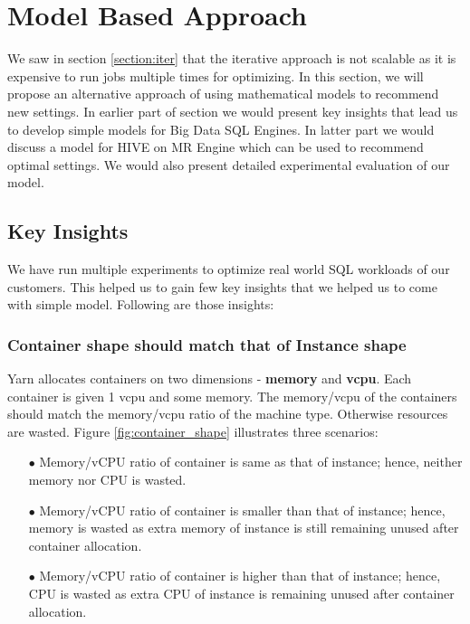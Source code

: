 \section{Model Based Approach}

We saw in section \ref{section:iter} that the iterative approach is not scalable as it is expensive to run jobs multiple times for optimizing. In this section, we will propose an alternative approach of using mathematical models to recommend new settings. In earlier part of section we would present key insights that lead us to develop simple models for Big Data SQL Engines. In latter part we would discuss a model for HIVE on MR Engine which can be used to recommend optimal settings. We would also present detailed experimental evaluation of our model.

\subsection{Key Insights}

We have run multiple experiments to optimize real world SQL workloads of our customers. This helped us to gain few key insights that we helped us to come with simple model. Following are those insights:

\noindent\subsubsection*{\bf Container shape should match that of Instance shape}
Yarn allocates containers on two dimensions - \textbf{memory} and \textbf{vcpu}. Each container is given 1 vcpu and some memory. The memory/vcpu of the containers should match the memory/vcpu ratio of the machine type. Otherwise resources are wasted. Figure \ref{fig:container_shape} illustrates three scenarios:
\begin{enumerate}[label=(\alph*)]
\item[$\bullet$] Memory/vCPU ratio of container is same as that of instance; hence, neither memory nor CPU is wasted. 
\item[$\bullet$] Memory/vCPU ratio of container is smaller than that of instance; hence, memory is wasted as extra memory of instance is still remaining unused after container allocation.
\item[$\bullet$] Memory/vCPU ratio of container is higher than that of instance; hence, CPU is wasted as extra CPU of instance is remaining unused after container allocation.
\end{enumerate}

